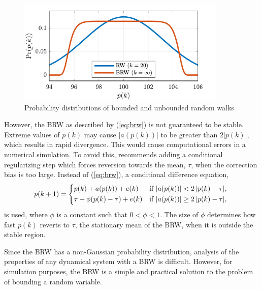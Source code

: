 
\begin{figure}[htp]
	\centering
	\includegraphics[height=5cm]{images/brw_pdf.pdf}
	\caption{Probability distributions of bounded and unbounded random walks}
	\label{fig:brw-pdf}
\end{figure}

However, the BRW as described by (\ref{eq:brw}) is not guaranteed to be stable. Extreme values of $p(k)$ may cause $|a(p(k))|$ to be greater than $2|p(k)|$, which results in rapid divergence. This would cause computational errors in a numerical simulation. To avoid this, \cite{nicolau_stationary_2002} recommends adding a conditional regularizing step which forces reversion towards the mean, $\tau$, when the correction bias is too large. Instead of (\ref{eq:brw}), a conditional difference equation,
\begin{equation} \label{eq:brw-reg}
	p(k+1) = \begin{cases*}
		p(k) + a(p(k)) + e(k) & if $\left|a(p(k)) \right| < 2\left| p(k) - \tau \right|$, \\
		\tau + \phi(p(k) - \tau) + e(k) & if $\left|a(p(k)) \right| \geq 2\left| p(k) - \tau \right|$,
	\end{cases*}
\end{equation}
is used, where $\phi$ is a constant such that $0<\phi<1$. The size of $\phi$ determines how fast $p(k)$ reverts to $\tau$, the stationary mean of the BRW, when it is outside the stable region.

Since the BRW has a non-Gaussian probability distribution, analysis of the properties of any dynamical system with a BRW is difficult. However, for simulation purposes, the BRW is a simple and practical solution to the problem of bounding a random variable.

